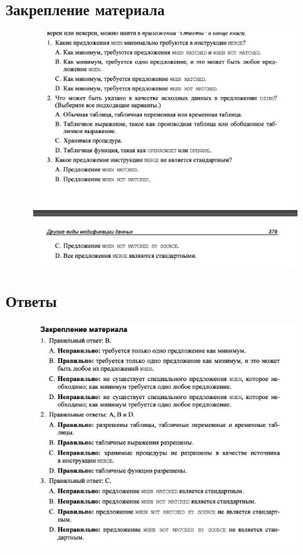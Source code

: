 \subsection*{Закрепление материала}

\begin{figure}[h!]
	\begin{center}
		\includegraphics[width=0.9\textwidth]{img/zakrep22.png}
	\end{center}
	\captionsetup{justification=centering}
\end{figure}
\clearpage

\subsection*{Ответы}

\begin{figure}[h!]
	\begin{center}
		\includegraphics[width=0.9\textwidth]{img/ans24.png}
	\end{center}
	\captionsetup{justification=centering}
\end{figure}


